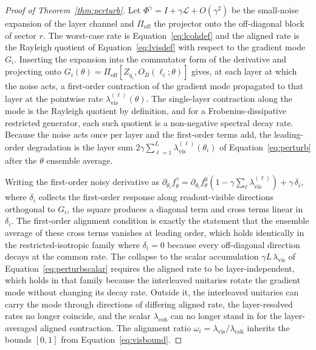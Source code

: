 \documentclass[10pt,a4paper]{amsart}
\newcommand{\lcoh}{\lambda_{\mathrm{coh}}}
\newcommand{\lvis}{\lambda_{\mathrm{vis}}}
\newcommand{\Lop}{\mathcal{L}}
\newcommand{\Pioff}{\Pi_{\mathrm{off}}}
\begin{document}
\begin{proof}[Proof of Theorem~\ref{thm:perturb}]
Let $\Phi^\gamma=I+\gamma\Lop+O(\gamma^2)$ be the small-noise expansion of the layer channel and $\Pioff$ the projector onto the off-diagonal block of sector $r$. The worst-case rate is Equation~\eqref{eq:lcohdef} and the aligned rate is the Rayleigh quotient of Equation~\eqref{eq:lvisdef} with respect to the gradient mode $G_i$. Inserting the expansion into the commutator form of the derivative and projecting onto $G_i(\theta)=\Pioff[Z_{q_i},O_B(\ell_i;\theta)]$ gives, at each layer at which the noise acts, a first-order contraction of the gradient mode propagated to that layer at the pointwise rate $\lvis^{(\ell)}(\theta)$. The single-layer contraction along the mode is the Rayleigh quotient by definition, and for a Frobenius-dissipative restricted generator, each such quotient is a non-negative spectral decay rate. Because the noise acts once per layer and the first-order terms add, the leading-order degradation is the layer sum $2\gamma\sum_{\ell=1}^{L}\lvis^{(\ell)}(\theta_i)$ of Equation~\eqref{eq:perturb} after the $\theta$ ensemble average.

Writing the first-order noisy derivative as $\partial_{\theta_i}f^\gamma_\theta=\partial_{\theta_i}f^0_\theta(1-\gamma\sum_\ell\lvis^{(\ell)})+\gamma\,\delta_i$, where $\delta_i$ collects the first-order response along readout-visible directions orthogonal to $G_i$, the square produces a diagonal term and cross terms linear in $\delta_i$. The first-order alignment condition is exactly the statement that the ensemble average of these cross terms vanishes at leading order, which holds identically in the restricted-isotropic family where $\delta_i=0$ because every off-diagonal direction decays at the common rate. The collapse to the scalar accumulation $\gamma L\,\lvis$ of Equation~\eqref{eq:perturbscalar} requires the aligned rate to be layer-independent, which holds in that family because the interleaved unitaries rotate the gradient mode without changing its decay rate. Outside it, the interleaved unitaries can carry the mode through directions of differing aligned rate, the layer-resolved rates no longer coincide, and the scalar $\lcoh$ can no longer stand in for the layer-averaged aligned contraction. The alignment ratio $\omega_i=\lvis/\lcoh$ inherits the bounds $[0,1]$ from Equation~\eqref{eq:visbound}.
\end{proof}
\end{document}
